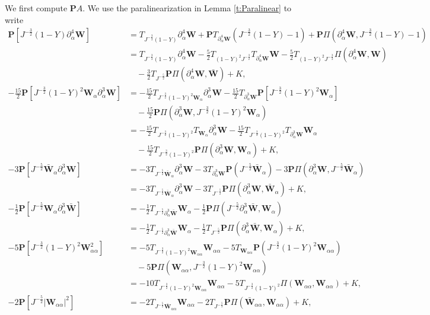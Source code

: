 \documentclass[10pt]{amsart}
\theoremstyle{remark}
\theoremstyle{definition}
\numberwithin{equation}{section}
\newcommand{\p}{\partial}
\newcommand{\al}{\alpha}
\newcommand{\f}{\frac}
\newcommand{\bw}{\mathbf{W}}
\newcommand{\nP}{{\mathbf P}}
\begin{document}
We first compute $\nP A$. We use the paralinearization in Lemma \ref{t:Paralinear} to write
\begin{align*}
\nP [J^{-\f32}(1-Y)\p^4_{\al}\bw]
    &= T_{J^{-\f32}(1-Y)}\p^4_{\al}\bw+\nP T_{\p^4_{\al}\bw}(J^{-\f32}(1-Y)-1)+\nP\Pi(\p^4_{\al}\bw,J^{-\f32}(1-Y)-1) \\
    &= T_{J^{-\f32}(1-Y)}\p^4_{\al}\bw- \f52 T_{(1-Y)^2J^{-\f32}}T_{\p^4_{\al}\bw} \bw -\f52 T_{(1-Y)^2J^{-\f32}}\Pi(\p^4_{\al}\bw,\bw) \\
    &\quad -\f32 T_{J^{-\f52}}\nP\Pi(\p^4_{\al}\bw, \bar{\bw})+K,\\
-\f{15}{2}\nP[J^{-\f32}(1-Y)^2\bw_{\al}\p^3_{\al}\bw] 
    &= -\f{15}{2} T_{J^{-\f32}(1-Y)^2\bw_{\al}}\p^3_{\al}\bw - \f{15}{2} T_{\p^3_{\al}\bw} \nP [J^{-\f32}(1-Y)^2\bw_{\al}] \\
    &\quad - \f{15}{2} \nP \Pi(\p^3_{\al}\bw, J^{-\f32}(1-Y)^2\bw_{\al}) \\
    &= -\f{15}{2} T_{J^{-\f32}(1-Y)^2}T_{\bw_{\al}}\p^3_{\al}\bw -\f{15}{2} T_{J^{-\f32}(1-Y)^2}T_{\p^3_{\al}\bw}\bw_{\al} \\
    &\quad - \f{15}{2} T_{J^{-\f32}(1-Y)^2}\nP \Pi(\p^3_{\al}\bw, \bw_{\al}) + K, \\
-3\nP[ J^{-\f52}\bar{\bw}_{\al}\p^3_{\al}\bw]
    &= -3 T_{J^{-\f52}\bar{\bw}_{\al}}\p^3_{\al}\bw - 3 T_{\p^3_{\al}\bw} \nP (J^{-\f52}\bar{\bw}_{\al}) - 3\nP\Pi(\p^3_{\al}\bw, J^{-\f52}\bar{\bw}_{\al}) \\
    &= -3 T_{J^{-\f52}\bar{\bw}_{\al}}\p^3_{\al}\bw - 3T_{J^{-\f52}}\nP\Pi(\p^3_{\al}\bw, \bar{\bw}_{\al}) +K, \\
-\f12 \nP[J^{-\f52}\bw_{\al}\p^3_{\al}\bar{\bw}] 
    &= -\f12 T_{J^{-\f52}\p^3_{\al}\bar{\bw}} \bw_{\al} -\f12 \nP \Pi(J^{-\f52}\p^3_{\al}\bar{\bw}, \bw_{\al}) \\
    &= -\f12 T_{J^{-\f52}\p^3_{\al}\bar{\bw}} \bw_{\al} -\f12 T_{J^{-\f52}}\nP \Pi(\p^3_{\al}\bar{\bw}, \bw_{\al}) + K,\\
-5\nP [J^{-\f32}(1-Y)^2\bw^2_{\al\al}] 
    &= -5 T_{J^{-\f32}(1-Y)^2\bw_{\al\al}} \bw_{\al \al} - 5 T_{\bw_{\al \al}} \nP(J^{-\f32}(1-Y)^2\bw_{\al\al}) \\
    &\quad -5 \nP \Pi(\bw_{\al \al}, J^{-\f32}(1-Y)^2\bw_{\al\al}) \\
    &= -10 T_{J^{-\f32}(1-Y)^2\bw_{\al\al}} \bw_{\al \al} -5  T_{J^{-\f32}(1-Y)^2}\Pi(\bw_{\al \al}, \bw_{\al\al}) + K,\\
-2 \nP [J^{-\f52}|\bw_{\al\al}|^2] 
    &= -2 T_{J^{-\f52}\bar{\bw}_{\al \al}}\bw_{\al \al} -2 T_{J^{-\f52}} \nP \Pi(\bar{\bw}_{\al \al}, \bw_{\al \al}) + K ,\\

\end{align*}
\end{document}
